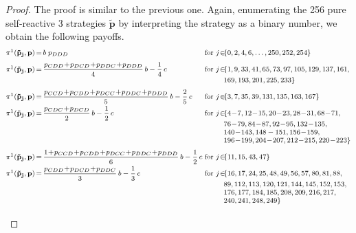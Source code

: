 \documentclass[11pt]{article}
\theoremstyle{plainCl1}
\theoremstyle{plainCl2}
\begin{document}
\begin{proof}
The proof is similar to the previous one. 
Again, enumerating the 256 pure self-reactive 3 strategies $\mathbf{\tilde p}$ by interpreting the strategy as a binary number, we obtain the following payoffs. 
\begin{equation*}\label{Eq:PayoffExpressionsReactiveThree}
\footnotesize
\setlength{\arraycolsep}{0mm}
\begin{array}{lclll}
\pi^1(\mathbf{\tilde p_j},\mathbf{p}) &{\, = \,}
&\displaystyle b \; p_{DDD} 
&~\text{for}~ j\! \in\! 
&\{0, 2, 4, 6, \dots, 250, 252, 254\} \\[0.2cm]

\pi^1(\mathbf{\tilde p_j},\mathbf{p}) &= 
&\displaystyle \frac{p_{CDD} \!+\! p_{DCD}\!+\!  p_{DDC} \!+\!  p_{DDD}}{4}\,b - \frac{1}{4}\,c 
&~\text{for}~ j\! \in\!  
& \{ 1, 9, 33, 41, 65, 73, 97, 105, 129, 137, 161,
	\\ & & &  &169, 193, 201, 225, 233\} \\[0.2cm]
    
\pi^1(\mathbf{\tilde p_j},\mathbf{p}) &= 
&\displaystyle \frac{p_{CCD} \!+\! p_{CDD} \!+\! p_{DCC} \!+\! p_{DDC} \!+\! p_{DDD}}{5}\,b - \frac{2}{5} \, c &~\text{for}~ j\! \in\!  
& \{ 3, 7, 35, 39, 131, 135, 163, 167\} \\[0.2cm]

\pi^1(\mathbf{\tilde p_j},\mathbf{p}) &= 
&\displaystyle \frac{p_{CDC} \!+\! p_{DCD}}{2}\,b - \frac{1}{2} \, c 
&~\text{for}~ j\! \in\!  
& \{ 4 \!- \!7, 12 \!- \!15, 20 \!- \!23, 28 \!- \!31, 68 \!- \!71,
    \\ & & &  &76 \!- \!79, 84 \!- \!87, 92 \!- \!95, 132 \!- \!135, 
    \\ & & & &140 \!- \!143, 148- 151, 156 \!- \!159, 
    \\ & & & &196 \!- \!199, 204 \!- \!207, 212 \!- \!215, 220 \!- \!223\} \\[0.2cm]
    
\pi^1(\mathbf{\tilde p_j},\mathbf{p}) &= 
&\displaystyle \frac{1\!+\!p_{CCD} \!+\! p_{CDD} \!+\! p_{DCC} \!+\! p_{DDC} \!+\! p_{DDD}}{6}\,b - \frac{1}{2} \, c 
&~\text{for}~ j\! \in\! 
& \{ 11, 15, 43, 47\} \\ [0.2cm]

\pi^1(\mathbf{\tilde p_j},\mathbf{p}) &= 
&\displaystyle \frac{p_{CDD} \!+\! p_{DCD} \!+\! p_{DDC}}{3}\,b - \frac{1}{3} \, c 
&~\text{for}~ j\! \in\! 
& \{16,17,24,25,48,49,56,57,80,81,88,
    \\ & & & &89,112, 113,120,121, 144,145,152,153,
    \\ & & & &176,177,184,185,208,209,216,217,
    \\ & & & &240, 241,248,249\} \\[0.2cm]
    

\end{array}
\end{equation*}
\end{proof}
\end{document}
